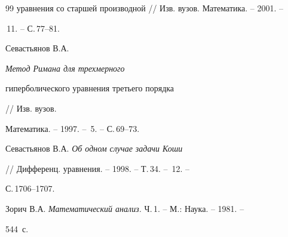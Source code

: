 \begin{thebibliography}{99}
{уравнения со старшей производной} // Изв. вузов. Математика. -- 2001. --


\No\,11. -- С.\,77--81.




Севастьянов В.А. {\it Метод Римана для трехмерного


гиперболического уравнения третьего порядка} // Изв. вузов.


Математика. -- 1997. -- \No\,5. -- С.\,69--73.




Севастьянов В.А. {\it Об одном случае задачи Коши}


// Дифференц. уравнения. -- 1998. -- Т.\,34. -- \No\,12. --


С.\,1706--1707.




Зорич В.А. {\it Математический анализ.} Ч.\,1. -- М.: Наука. -- 1981. --


544~с.





\end{thebibliography}





\vskip 2cm












\label{end}





